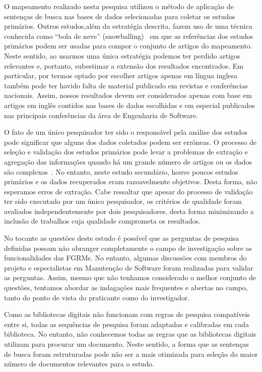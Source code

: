 O mapeamento realizado nesta pesquisa utilizou o método de aplicação de
sentenças de busca nas bases de dados selecionadas para coletar os estudos
primários.  Outros estudos,além da estratégia descrita, fazem uso de uma técnica
conhecida como ``bola de neve'' (snowballing)~\cite{wohlin2014guidelines} em que
as referências dos estudos primários podem ser usadas para compor o conjunto de
artigos do mapeamento. Neste sentido, ao usarmos uma única estratégia podemos
ter perdido artigos relevantes e, portanto, subestimar a extensão dos resultados
encontrados. Em particular, por termos optado por escolher artigos apenas em
língua inglesa também pode ter havido falta de material publicado em revistas e
conferências nacionais. Assim, nossos resultados devem ser considerados apenas
com base em artigos em inglês contidos nas bases de dados escolhidas  e em
especial publicados nas principais conferências da área de Engenharia de
Software.

O fato de um único pesquisador ter sido o responsável pela análise dos estudos
pode significar que alguns dos dados coletados podem ser errôneas. O processo de
seleção e validação dos estudos primários pode levar a problemas de extração e
agregação das informações quando há um grande número de artigos ou os dados são
complexos~\cite{keele2007guidelines}. No entanto, neste estudo secundário, houve
poucos estudos primários e os dados recuperados eram razoavelmente objetivos.
Desta forma, não esperamos erros de extração. Cabe ressaltar que apesar do
processo de validação ter sido executado por um único pesquisador, os critérios
de qualidade foram avaliados independentemente por dois pesquisadores, desta
forma minimizando a inclusão de trabalhos cuja qualidade comprometa os
resultados.

No tocante as questões deste estudo  é  possível que as perguntas de pesquisa
definidas possam não abranger completamente o campo de investigação sobre as
funcionalidades das FGRMs. No entanto, algumas discussões com membros do
projeto e especialistas em Manutenção de Software foram realizadas para validar
as perguntas. Assim, mesmo que não tenhamos considerado o melhor conjunto de
questões, tentamos abordar as indagações mais frequentes e abertas no campo,
tanto do ponto de vista do praticante como do investigador.

Como as bibliotecas digitais não funcionam com regras de pesquisa compatíveis
entre si, todas as sequências de pesquisa foram adaptadas e calibradas em cada
biblioteca. No entanto, não conhecemos todas as regras que as bibliotecas
digitais utilizam para procurar um documento. Neste sentido, a forma que as
sentenças de busca foram estruturadas pode não ser a mais otimizada para seleção
do maior número de documentos relevantes para o estudo.

